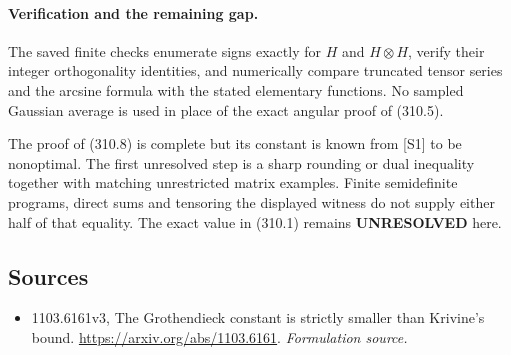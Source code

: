 \documentclass[11pt]{article}
\begin{document}
\paragraph{Verification and the remaining gap.}
The saved finite checks enumerate signs exactly for $H$ and
$H\otimes H$, verify their integer orthogonality identities, and
numerically compare truncated tensor series and the arcsine formula
with the stated elementary functions. No sampled Gaussian average
is used in place of the exact angular proof of (310.5).

The proof of (310.8) is complete but its constant is known from
[S1] to be nonoptimal. The first unresolved step is a sharp rounding
or dual inequality together with matching unrestricted matrix
examples. Finite semidefinite programs, direct sums and tensoring
the displayed witness do not supply either half of that equality.
The exact value in (310.1) remains \textbf{UNRESOLVED} here.
\subsection{Sources}
\begin{itemize}
\item[S1]1103.6161v3, The Grothendieck constant is strictly smaller than Krivine's bound.
\url{https://arxiv.org/abs/1103.6161}.
\textit{Formulation source.}
\end{itemize}
\end{document}
